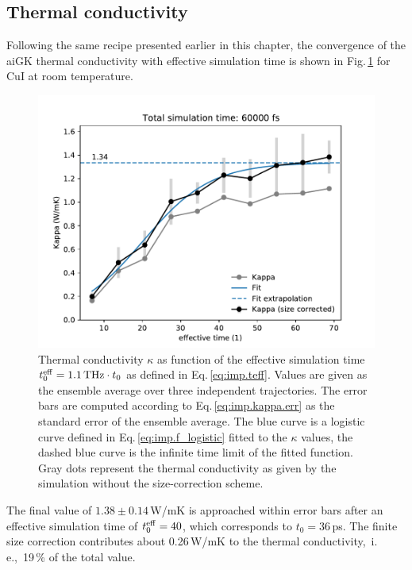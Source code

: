 \subsection{Thermal conductivity}
Following the same recipe presented earlier in this chapter, the convergence of the aiGK thermal conductivity with effective simulation time is shown in Fig.\,\ref{fig:imp.kappa.convergence.CuI} for CuI at room temperature.
\begin{figure}
	\includegraphics[width=\textwidth]{./data/plots/kappa_convergence/examples/216_CuI.pdf}
	\caption{Thermal conductivity $\kappa$ as function of the effective simulation time $t^{\rm eff}_0 = 1.1\,{\rm THz} \cdot t_0$ as defined in Eq.\,\ref{eq:imp.teff}. Values are given as the ensemble average over three independent trajectories. The error bars are computed according to Eq.\,\eqref{eq:imp.kappa.err} as the standard error of the ensemble average. The blue curve is a logistic curve defined in Eq.\,\eqref{eq:imp.f_logistic} fitted to the $\kappa$ values, the dashed blue curve is the infinite time limit of the fitted function. Gray dots represent the thermal conductivity as given by the simulation without the size-correction scheme.
}
	\label{fig:imp.kappa.convergence.CuI}
\end{figure}
The final value of $1.38 \pm 0.14$\,W/mK is approached within error bars after an effective simulation time of $t^{\rm eff}_0 = 40$, which corresponds to $t_0=36$\,ps. The finite size correction contributes about 0.26\,W/mK to the thermal conductivity,~i.\,e.,~19\,\% of the total value.

